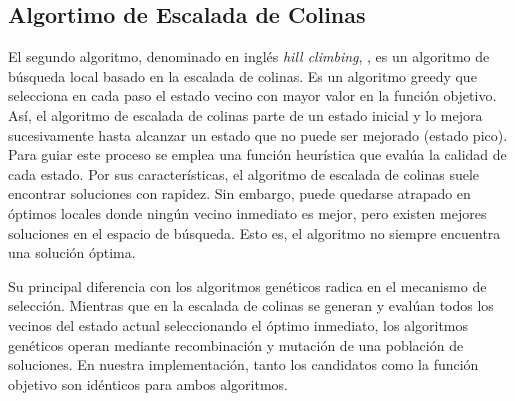 

\subsection{Algortimo de Escalada de Colinas}
\label{alg:approachHC}

El segundo algoritmo, denominado en inglés \textit{hill climbing},
\cite{Russell:2009, Cormen2009, kleinberg2006}, es un algoritmo de búsqueda local basado en la escalada de colinas.
Es un algoritmo greedy que selecciona en cada paso el estado vecino con mayor
valor en la función objetivo. 
Así, el algoritmo de escalada de colinas parte de un estado inicial y lo mejora sucesivamente hasta alcanzar un estado que no puede ser mejorado (estado pico). 
Para guiar este proceso se emplea una función heurística que evalúa la calidad de cada estado.
Por sus características, el algoritmo de escalada de colinas suele encontrar soluciones
con rapidez. Sin embargo, puede quedarse atrapado en óptimos locales donde
ningún vecino inmediato es mejor, pero existen mejores soluciones en el espacio
de búsqueda. Esto es, el algoritmo no siempre encuentra una solución óptima.

Su principal diferencia con los algoritmos genéticos radica en el mecanismo de selección. Mientras que en la escalada de colinas se generan y evalúan todos los vecinos del estado actual seleccionando el óptimo inmediato, 
los algoritmos genéticos operan mediante recombinación y mutación de una población de soluciones. 
En nuestra implementación, tanto los candidatos como la función objetivo son idénticos para ambos algoritmos.


